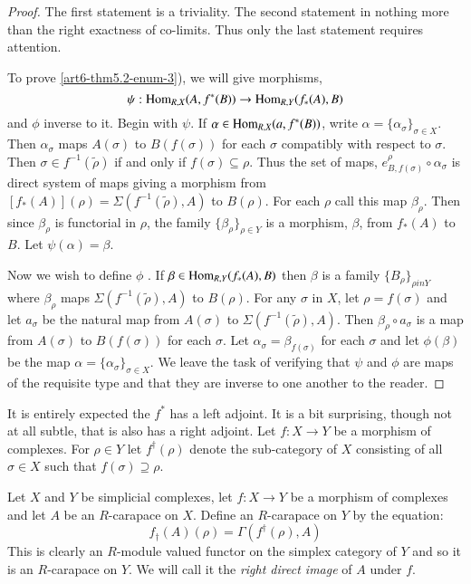 \begin{proof}
The first statement is a triviality. The second statement in nothing more than the right exactness of co-limits. Thus only the last statement requires attention.

To prove \ref{art6-thm5.2-enum-3}), we will give morphisms,
$$
\psi : \operatorname{Hom}_{R,X}(A, f^{*}(B))\rightarrow \operatorname{Hom}_{R,Y}(f_{*}(A), B)
$$
and $\phi$ inverse to it. Begin with $\psi$. If $\alpha \in  \operatorname{Hom}_{R,X}(a, f^{*}(B))$, write $\alpha =\{\alpha_{\sigma}\}_{\sigma \in X}$. Then $\alpha_{\sigma}$ maps $A(\sigma)$ to $B(f(\sigma))$ for each $\sigma$ compatibly with respect to $\sigma$. Then  $\sigma \in f^{-1}(\tilde{\rho})$ if and only if $f(\sigma)\subseteq \rho$. Thus the set of maps, $e_{B, f(\sigma)}^{\rho} \circ \alpha_{\sigma}$ is direct system of maps giving a morphism from $[f_{*}(A)](\rho)= \Sigma(f^{-1}(\tilde{\rho}), A)$ to $B(\rho)$. For each $\rho$ call this map $\beta_{\rho}$. Then since $\beta_{\rho}$ is functorial in $\rho$, the family $\{\beta_{\rho}\}_{\rho \in Y}$ is a morphism, $\beta$, from $f_{*}(A)$ to $B$. Let $\psi (\alpha) = \beta$.

Now we wish to define $\phi$ . If $\beta \in \operatorname{Hom}_{R,Y}(f_{*}(A), B)$ then $\beta$ is a family $\{B_{\rho}\}_{\rho in Y}$ where $\beta_{\rho}$ maps $\Sigma(f^{-1}(\tilde{\rho}), A)$ to $B(\rho)$. For any $\sigma$ in $X$, let $\rho = f(\sigma)$ and let $a_{\sigma}$ be the natural map from $A(\sigma)$ to $\Sigma(f^{-1}(\tilde{\rho}), A)$. Then $\beta_{\rho} \circ a_{\sigma}$ is a map from $A(\sigma)$ to $B(f(\sigma))$ for each $\sigma$. Let $\alpha_{\sigma} = \beta_{f(\sigma)}$ for each $\sigma$ and let $\phi(\beta)$ be the map $\alpha = \{\alpha_{\sigma}\}_{\sigma \in X}$. We leave the task of verifying that $\psi$ and $\phi$ are maps of the requisite type and that they are inverse to one another to the reader.
\end{proof}

It is entirely expected the $f^{*}$ has a left adjoint. It is a bit surprising, though not at all subtle, that is also has a right adjoint. Let $f : X \rightarrow Y$ be a morphism of complexes. For $\rho \in Y$ let $f^\dagger(\rho)$ denote the sub-category of $X$ consisting of all $\sigma \in X$ such that $f(\sigma) \supseteq \rho$.

\begin{definition}\label{art6-definition-5.6}
Let $X$ and $Y$ be simplicial complexes, let $f : X\rightarrow Y$ be a morphism of complexes and let $A$ be an $R$-carapace on $X$. Define an $R$-carapace on $Y$ by the equation:
$$
f_{\dagger}(A)(\rho) = \Gamma(f^{\dagger}(\rho), A)
$$
This is clearly an $R$-module valued functor on the simplex category of $Y$ and so it is an $R$-carapace on $Y$. We will call it the \textit{right direct image} of $A$ under $f$.
\end{definition} 

